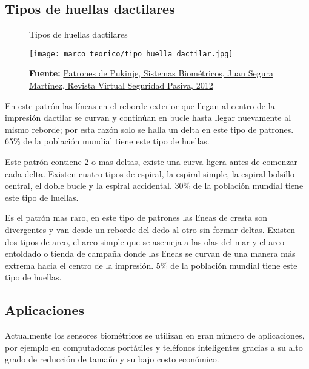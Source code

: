 \documentclass[../principal]{subfiles}
\begin{document}
  \subsection{Tipos de huellas dactilares}

  \begin{description}[align=left]

    \begin{figure}[H]
      \centering
      \caption{Tipos de huellas dactilares}
      \texttt{[image: marco\_teorico/tipo\_huella\_dactilar.jpg]}
      \caption*{\textbf{Fuente:} \href{http://dis.um.es/~lopezquesada/documentos/IES_1213/SAD/curso/UT3/ActividadesAlumnos/12/enlaces/biometricos.html}{Patrones de Pukinje, Sistemas Biométricos, Juan Segura Martínez, Revista Virtual Seguridad Pasiva, 2012}}
    \end{figure}

    \item[Bucle:] En este patrón las líneas en el reborde exterior que llegan al centro de la impresión dactilar se curvan y continúan en bucle hasta llegar nuevamente al mismo reborde; por esta razón solo se halla un delta en este tipo de patrones. 65\% de la población mundial tiene este tipo de huellas.
    \item[Espiral:] Este patrón contiene 2 o mas deltas, existe una curva ligera antes de comenzar cada delta. Existen cuatro tipos de espiral, la espiral simple, la espiral bolsillo central, el doble bucle y la espiral accidental. 30\% de la población mundial tiene este tipo de huellas.
    \item[Arco:] Es el patrón mas raro, en este tipo de patrones las líneas de cresta son divergentes y van desde un reborde del dedo al otro sin formar deltas. Existen dos tipos de arco, el arco simple que se asemeja a las olas del mar y el arco entoldado o tienda de campaña donde las líneas se curvan de una manera más extrema hacia el centro de la impresión. 5\% de la población mundial tiene este tipo de huellas.
  \end{description}

  \subsection{Aplicaciones}

  Actualmente los sensores biométricos se utilizan en gran número de aplicaciones, por ejemplo en computadoras portátiles y teléfonos inteligentes gracias a su alto grado de reducción de tamaño y su bajo costo económico.
\end{document}
